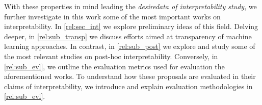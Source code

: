 With these properties in mind leading the \emph{desiredata of interpretability study}, we further 
investigate in this work some of the most important works on interpretability. In 
\autoref{rel:sec_int} we explore preliminary ideas of this field. Delving deeper, in 
\autoref{rel:sub_transp} we discuss efforts aimed at transparency of machine learning approaches. 
In contrast, in \autoref{rel:sub_post} we explore and study 
some of the most relevant studies on post-hoc interpretability. Conversely, in 
\autoref{rel:sub_evl}, we outline the evaluation metrics used for evaluation the aforementioned 
works. To understand how these proposals are evaluated in their claims of interpretability, we 
introduce and explain evaluation methodologies in \autoref{rel:sub_evl}.







